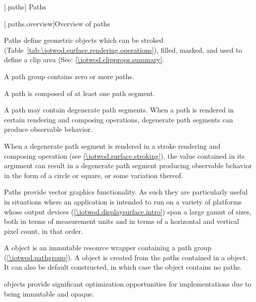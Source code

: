 
 [\iotwod.paths] {Paths}

 [\iotwod.paths.overview]{Overview of paths}

\pnum
Paths define geometric objects which can be stroked (Table~\ref{tab:\iotwod.surface.rendering.operations}), filled, masked, and used to define a clip area (See: \ref{\iotwod.clipprops.summary}.

\pnum
A path group contains zero or more paths.

\pnum
A path is composed of at least one path segment.

\pnum
A path may contain degenerate path segments. When a path is rendered in certain rendering and composing operations, degenerate path segments can produce observable behavior.
\begin{example}
When a degenerate path segment is rendered in a stroke rendering and composing operation (see \ref{\iotwod.surface.stroking}), the  value contained in its  argument can result in a degenerate path segment producing observable behavior in the form of a circle or square, or some variation thereof.
\end{example}

\pnum
Paths provide vector graphics functionality. As such they are particularly useful in situations where an application is intended to run on a variety of platforms whose output devices (\ref{\iotwod.displaysurface.intro}) span a large gamut of sizes, both in terms of measurement units and in terms of a horizontal and vertical pixel count, in that order.
%

\pnum
A  object is an immutable resource wrapper containing a path group (\ref{\iotwod.pathgroup}). A  object is created from the paths contained in a  object. It can also be default constructed, in which case the  object contains no paths.
\begin{note}
 objects provide significant optimization opportunities for implementations due to being immutable and opaque.
\end{note}

